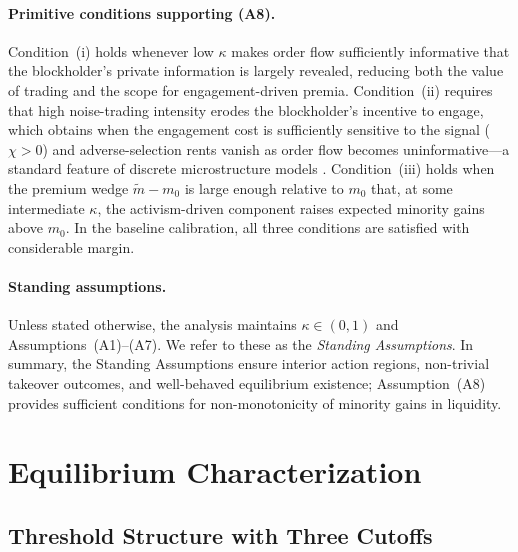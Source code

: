 \documentclass[11pt]{article}
\newcommand{\1}{\mathbf{1}}
\begin{document}
\paragraph{Primitive conditions supporting \textup{(A8)}.}
Condition~(i) holds whenever low $\kappa$ makes order flow sufficiently informative that the blockholder's private information is largely revealed, reducing both the value of trading and the scope for engagement-driven premia. Condition~(ii) requires that high noise-trading intensity erodes the blockholder's incentive to engage, which obtains when the engagement cost is sufficiently sensitive to the signal ($\chi>0$) and adverse-selection rents vanish as order flow becomes uninformative---a standard feature of discrete microstructure models \citep{EdmansGoldsteinJiang2015}. Condition~(iii) holds when the premium wedge $\tilde{m}-m_0$ is large enough relative to $m_0$ that, at some intermediate $\kappa$, the activism-driven component raises expected minority gains above $m_0$. In the baseline calibration, all three conditions are satisfied with considerable margin.

\paragraph{Standing assumptions.}
Unless stated otherwise, the analysis maintains $\kappa\in(0,1)$ and Assumptions~\textup{(A1)}--\textup{(A7)}. We refer to these as the \emph{Standing Assumptions}. In summary, the Standing Assumptions ensure interior action regions, non-trivial takeover outcomes, and well-behaved equilibrium existence; Assumption~\textup{(A8)} provides sufficient conditions for non-monotonicity of minority gains in liquidity.

\section{Equilibrium Characterization}
\label{sec:equilibrium}

\subsection{Threshold Structure with Three Cutoffs}
\end{document}
